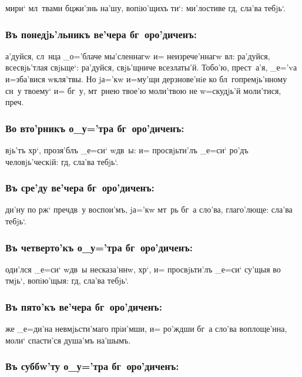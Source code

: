 \documentclass[14pt,twoside]{extreport}
\renewcommand{\*}{~~\raise3pt\hbox{\footnotesize*}}
\begin{document}
мири` мл~твами бц жи'знь на'шу, вопiю'щихъ ти`: ми'лостиве
гд, сла'ва тебjь`.

\subsubsection{Въ понедjь'льникъ ве'чера бг~оро'диченъ:}

а'дуйся, сл~нца _о='блаче мы'сленнагw и= неизрече'ннагw вл:
ра'дуйся, всесвjь'тлая свjьще`: ра'дуйся, свjь'щниче всезлаты'й. Тобо'ю,
прест~а'я, _е='vа и=зба'вися w\т кля'твы. Но jа='кw и=му'щи дерзнове'нiе ко
бл~гопремjь'нному сн~у твоему` и= бг~у, мт~рнею твое'ю моли'твою не w=скудjь'й
моли'тися, преч.

\subsubsection{Во вто'рникъ о_у='тра бг~оро'диченъ:}

вjь'тъ хр`, прозя'блъ _е=си` w\т дв~ы: и= просвjьти'лъ _е=си`
ро'дъ человjь'ческiй: гд, сла'ва тебjь`.

\subsubsection{Въ сре'ду ве'чера бг~оро'диченъ:}

ди'ну по рж` преч дв~у воспои'мъ, jа='кw мт~рь бг~а
сло'ва, глаго'люще: сла'ва тебjь`.

\subsubsection{Въ четверто'къ о_у='тра бг~оро'диченъ:}

оди'лся _е=си` w\т дв~ы несказа'ннw, хр`, и= просвjьти'лъ _е=си`
су'щыя во тмjь`, вопiю'щыя: гд, сла'ва тебjь`.

\subsubsection{Въ пято'къ ве'чера бг~оро'диченъ:}

же _е=ди'на невмjьсти'маго прiи'мши, и= ро'ждши бг~а сло'ва
воплоще'нна, моли` спасти'ся душа'мъ на'шымъ.

\subsubsection{Въ суббw'ту о_у='тра бг~оро'диченъ:}
\end{document}
